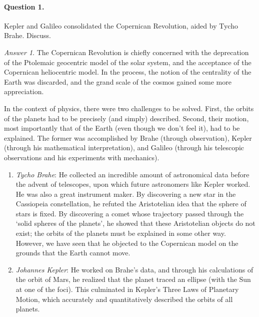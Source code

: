 \documentclass[11pt]{article}
\theoremstyle{remark}
\newtheorem*{answer}{Answer}
\begin{document}
    \paragraph{Question 1.} Kepler and Galileo consolidated the Copernican
    Revolution, aided by Tycho Brahe. Discuss.

    \begin{answer}
        The Copernican Revolution is chiefly concerned with the deprecation of the
        Ptolemaic geocentric model of the solar system, and the acceptance of the
        Copernican heliocentric model. In the process, the notion of the centrality
        of the Earth was discarded, and the grand scale of the cosmos gained some
        more appreciation.

        In the context of physics, there were two challenges to be solved. First, the
        orbits of the planets had to be precisely (and simply) described. Second,
        their motion, most importantly that of the Earth (even though we don't feel
        it), had to be explained. The former was accomplished by Brahe (through
        observation), Kepler (through his mathematical interpretation), and Galileo
        (through his telescopic observations and his experiments with mechanics).

        \begin{enumerate}
            \item \emph{Tycho Brahe}: He collected an incredible amount of
            astronomical data before the advent of telescopes, upon which future
            astronomers like Kepler worked. He was also a great instrument maker. By
            discovering a new star in the Cassiopeia constellation, he refuted the
            Aristotelian idea that the sphere of stars is fixed. By discovering a
            comet whose trajectory passed through the `solid spheres of the planets',
            he showed that these Aristotelian objects do not exist; the orbits of the
            planets must be explained in some other way. However, we have seen that he
            objected to the Copernican model on the grounds that the Earth cannot
            move.

            \item \emph{Johannes Kepler}: He worked on Brahe's data, and through his
            calculations of the orbit of Mars, he realized that the planet traced an
            ellipse (with the Sun at one of the foci). This culminated in Kepler's
            Three Laws of Planetary Motion, which accurately and quantitatively
            described the orbits of all planets.


\end{enumerate}
\end{answer}
\end{document}
